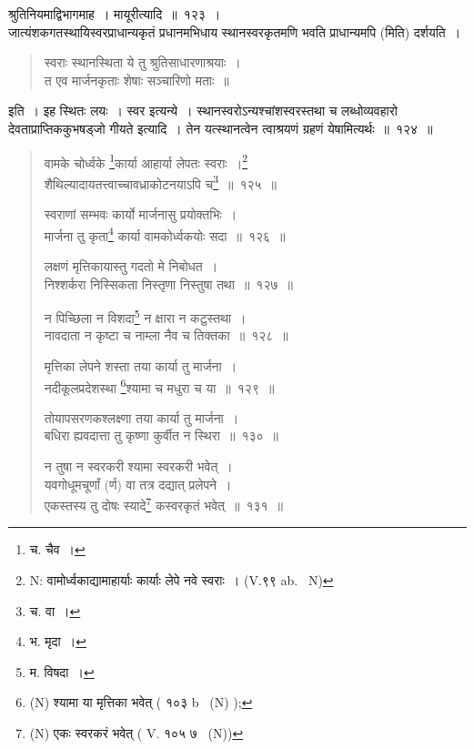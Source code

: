 \documentclass[11pt, openany]{book}
\begin{document}
{\qtt श्रुतिनियमाद्विभागमाह}~। मायूरीत्यादि~॥~१२३~।\\

जात्यंशकगतस्थायिस्वरप्राधान्यकृतं प्रधानमभिधाय स्थानस्वरकृतमणि भवति
प्राधान्यमपि (मिति) दर्शयति~।

\begin{quote}
{\qt स्वराः स्थानस्थिता ये तु श्रुतिसाधारणाश्रयाः~।\\
 त एव मार्जनकृताः शेषाः सञ्चारिणो मताः~॥}
\end{quote}

\noindent
इति~। इह स्थितः लयः~। स्वर इत्यन्ये~। स्थानस्वरोऽन्यश्चांशस्वरस्तथा च लब्धोव्यवहारो देवताप्राप्तिककुभषड्जो गीयते इत्यादि~। तेन यत्स्थानत्वेन त्वाश्रयणं ग्रहणं येषामित्यर्थः~॥~१२४~॥

\newpage

\begin{quote}
{\na वामके चोर्ध्वके \renewcommand{\thefootnote}{1}\footnote{च. चैव~।}कार्या आहार्या लेपतः स्वराः~।\renewcommand{\thefootnote}{1a}\footnote{N: वामोर्ध्वकाद्यामाहार्याः कार्याः लेपे नवे स्वराः~।  (V.९९ ab. \textendash\ N)}\\
शैथिल्यादायतत्त्वाच्चावध्राकोटनयाऽपि च\renewcommand{\thefootnote}{2}\footnote{च. वा~।}~॥~१२५~॥

स्वराणां सम्भवः कार्यो मार्जनासु प्रयोक्तभिः~।\\
मार्जना तु कृता\renewcommand{\thefootnote}{3}\footnote{भ. मृदा~।} कार्या वामकोर्ध्वकयोः सदा~॥~१२६~॥

लक्षणं मृत्तिकायास्तु गदतो मे निबोधत~।\\
निश्शर्करा निस्सिकता निस्तृणा निस्तुषा तथा~॥~१२७~॥

न पिच्छिला न विशदा\renewcommand{\thefootnote}{4}\footnote{म. विषदा~।} न क्षारा न कटुस्तथा~।\\
नावदाता न कृष्टा च नाम्ला नैव च तिक्तका~॥~१२८~॥

मृत्तिका लेपने शस्ता तया कार्या तु मार्जना~।\\
नदीकूलप्रदेशस्था \renewcommand{\thefootnote}{5}\footnote{(N) श्यामा या मृत्तिका भवेत् ( १०३ b \textendash\  (N) );}श्यामा च मधुरा च या~॥~१२९~॥

तोयापसरणकश्लक्ष्णा तया कार्या तु मार्जना~।\\
बधिरा ह्यवदात्ता तु कृष्णा कुर्वीत न स्थिरा~॥~१३०~॥

न तुषा न स्वरकरी श्यामा स्वरकरी भवेत्~।\\
यवगोधूमचूर्णां (र्ण) वा तत्र दद्यात् प्रलेपने~।\\
एकस्तस्य तु दोषः स्यादे\renewcommand{\thefootnote}{6}\footnote{(N) एकः स्वरकरं भवेत् ( V. १०५ ७ \textendash\  (N))} कस्वरकृतं भवेत्~॥~१३१~॥}
\end{quote}
\end{document}
